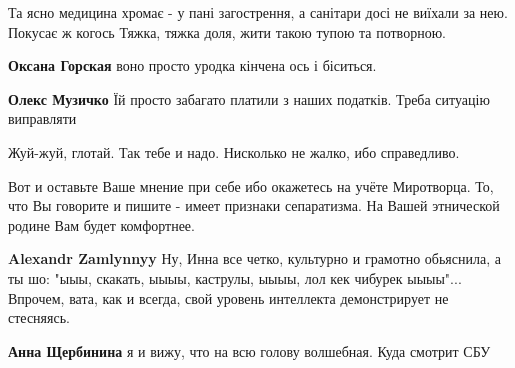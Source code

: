 \begin{itemize}


Та ясно медицина хромає - у пані загострення, а санітари досі не виїхали за
нею. Покусає ж когось \Smiley[1.0][yellow] Тяжка, тяжка доля, жити такою тупою та потворною.

\begin{itemize}

\textbf{Оксана Горская} воно просто уродка кінчена ось і біситься.


\textbf{Олекс Музичко} Їй просто забагато платили з наших податків. Треба ситуацію виправляти
\end{itemize}


Жуй-жуй, глотай. Так тебе и надо. Нисколько не жалко, ибо справедливо.



Вот и оставьте Ваше мнение при себе ибо окажетесь на учёте Миротворца. То, что
Вы говорите и пишите - имеет признаки сепаратизма. На Вашей этнической родине
Вам будет комфортнее.

\begin{itemize}

\textbf{Alexandr Zamlynnyy} Ну, Инна все четко, культурно и грамотно обьяснила, а ты шо: "ыыы, скакать, ыыыы, каструлы, ыыыы, лол кек чибурек ыыыы"... Впрочем, вата, как и всегда, свой уровень интеллекта демонстрирует не стесняясь.


\textbf{Анна Щербинина} я и вижу, что на всю голову волшебная. Куда смотрит СБУ



\end{itemize}
\end{itemize}

